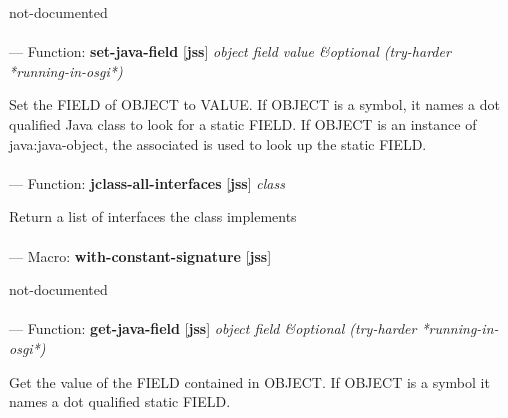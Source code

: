 \begin{adjustwidth}{5em}{5em}
not-documented
\end{adjustwidth}

\paragraph{}
\label{JSS:SET-JAVA-FIELD}
--- Function: \textbf{set-java-field} [\textbf{jss}] \textit{object field value \&optional (try-harder *running-in-osgi*)}

\begin{adjustwidth}{5em}{5em}
Set the FIELD of OBJECT to VALUE.
If OBJECT is a symbol, it names a dot qualified Java class to look for
a static FIELD.  If OBJECT is an instance of java:java-object, the
associated is used to look up the static FIELD.
\end{adjustwidth}

\paragraph{}
\label{JSS:JCLASS-ALL-INTERFACES}
--- Function: \textbf{jclass-all-interfaces} [\textbf{jss}] \textit{class}

\begin{adjustwidth}{5em}{5em}
Return a list of interfaces the class implements
\end{adjustwidth}

\paragraph{}
\label{JSS:WITH-CONSTANT-SIGNATURE}
--- Macro: \textbf{with-constant-signature} [\textbf{jss}] \textit{}

\begin{adjustwidth}{5em}{5em}
not-documented
\end{adjustwidth}

\paragraph{}
\label{JSS:GET-JAVA-FIELD}
--- Function: \textbf{get-java-field} [\textbf{jss}] \textit{object field \&optional (try-harder *running-in-osgi*)}

\begin{adjustwidth}{5em}{5em}
Get the value of the FIELD contained in OBJECT.
If OBJECT is a symbol it names a dot qualified static FIELD.
\end{adjustwidth}

